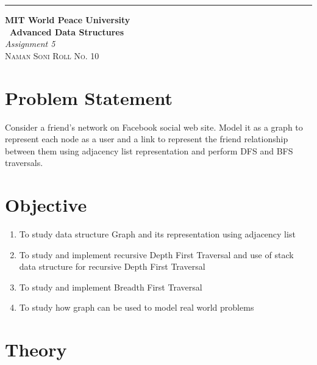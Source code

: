 \documentclass{article}
\begin{document}
\begin{titlepage} %
	
	\raggedleft\rule{1pt}{\textheight} %
	\hspace{0.05\textwidth} %
	\parbox[b]{0.75\textwidth}
	{ %
		
		{\Huge\bfseries MIT World Peace University \\[0.5\baselineskip] \ Advanced Data Structures}\\[2\baselineskip] %
		{\large\textit{Assignment 5}}\\[4\baselineskip] %
		{\Large\textsc{Naman Soni Roll No. 10}} %
		
		\vspace{0.5\textheight} %
	}
	
\end{titlepage}
\tableofcontents
\pagebreak
\section{\textbf{Problem Statement}}
Consider a friend’s network on Facebook social web site. Model it as a graph to represent each
node as a user and a link to represent the friend relationship between them using adjacency list
representation and perform DFS and BFS traversals.
\section{\textbf{Objective}}
\begin{enumerate}
    \item To study data structure Graph and its representation using adjacency list
    \item To study and implement recursive Depth First Traversal and use of stack data structure for recursive Depth First Traversal
    \item To study and implement Breadth First Traversal
    \item To study how graph can be used to model real world problems
\end{enumerate}
\section{\textbf{Theory}}
\end{document}
